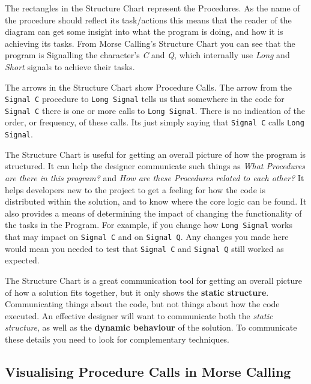The rectangles in the Structure Chart represent the Procedures. As the name of the procedure should reflect its task/actions this means that the reader of the diagram can get some insight into what the program is doing, and how it is achieving its tasks. From Morse Calling's Structure Chart you can see that the program is Signalling the character's \emph{C} and \emph{Q}, which internally use \emph{Long} and \emph{Short} signals to achieve their tasks.

The arrows in the Structure Chart show Procedure Calls. The arrow from the \texttt{Signal C} procedure to \texttt{Long Signal} tells us that somewhere in the code for \texttt{Signal C} there is one or more calls to \texttt{Long Signal}. There is no indication of the order, or frequency, of these calls. Its just simply saying that \texttt{Signal C} calls \texttt{Long Signal}.

The Structure Chart is useful for getting an overall picture of how the program is structured. It can help the designer communicate such things as \emph{What Procedures are there in this program?} and \emph{How are these Procedures related to each other?} It helps developers new to the project to get a feeling for how the code is distributed within the solution, and to know where the core logic can be found. It also provides a means of determining the impact of changing the functionality of the tasks in the Program. For example, if you change how \texttt{Long Signal} works that may impact on \texttt{Signal C} and on \texttt{Signal Q}. Any changes you made here would mean you needed to test that \texttt{Signal C} and \texttt{Signal Q} still worked as expected.

\bigskip

The Structure Chart is a great communication tool for getting an overall picture of how a solution fits together, but it only shows the \textbf{static structure}. Communicating things about the code, but not things about how the code executed. An effective designer will want to communicate both the \emph{static structure}, as well as the \textbf{dynamic behaviour} of the solution. To communicate these details you need to look for complementary techniques.


\subsection{Visualising Procedure Calls in Morse Calling} %
\label{sub:visualising_procedure_calls_in_morse_calling}

